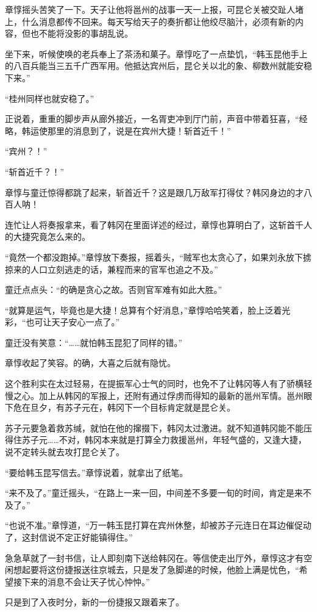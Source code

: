 章惇摇头苦笑了一下。天子让他将邕州的战事一天一上报，可昆仑关被交趾人堵上，什么消息都传不回来。每天写给天子的奏折都让他绞尽脑汁，必须有新的内容，但也不能将没影的事胡乱说。

坐下来，听候使唤的老兵奉上了茶汤和菓子。章惇吃了一点垫饥，“韩玉昆他手上的八百兵能当三五千广西军用。他抵达宾州后，昆仑关以北的象、柳数州就能安稳下来。”

“桂州同样也就安稳了。”

正说着，重重的脚步声从廊外接近，一名胥吏冲到厅门前，声音中带着狂喜，“经略，韩运使那里的消息到了，说是在宾州大捷！斩首近千！”

“宾州？！”

“斩首近千？！”

章惇与童迁惊得都跳了起来，斩首近千？这是跟几万敌军打得仗？韩冈身边的才八百人呐！

连忙让人将奏报拿来，看了韩冈在里面详述的经过，章惇也算明白了，这斩首千人的大捷究竟怎么来的。

“竟然一个都没跑掉。”章惇放下奏报，摇着头，“贼军也太贪心了，如果刘永放下掳掠来的人口立刻逃走的话，兼程而来的官军也追之不及。”

童迁点点头：“的确是贪心之故。否则官军难有如此大胜。”

“就算是运气，毕竟也是大捷！总算有个好消息，”章惇哈哈笑着，脸上泛着光彩，“也可让天子安心一点了。”

童迁没有笑意：“……就怕韩玉昆犯了同样的错。”

章惇收起了笑容。的确，大喜之后就有隐忧。

这个胜利实在太过轻易，在提振军心士气的同时，也免不了让韩冈等人有了骄横轻慢之心。加上从韩冈的军报上，还附有通过俘虏而得知的最新的邕州军情。邕州眼下危在旦夕，有苏子元在，韩冈下一个目标肯定就是昆仑关。

苏子元要急着救苏缄，就怕在他的撺掇下，韩冈太过激进。就不知道韩冈能不能压得住苏子元……不对，韩冈本来就是打算全力救援邕州，年轻气盛的，又逢大捷，说不定转头就去攻打昆仑关了。

“要给韩玉昆写信去。”章惇说着，就拿出了纸笔。

“来不及了。”童迁摇头，“在路上一来一回，中间差不多要一旬的时间，肯定是来不及了。”

“也说不准。”章惇道，“万一韩玉昆打算在宾州休整，却被苏子元连日在耳边催促动了，这封信说不定正好能镇得住。”

急急草就了一封书信，让人即刻南下送给韩冈在。等信使走出厅外，章惇这才有空闲想起要将这份捷报送往京城去，只是发了急脚递的时候，他脸上满是忧色，“希望接下来的消息不会让天子忧心忡忡。”

只是到了入夜时分，新的一份捷报又跟着来了。

